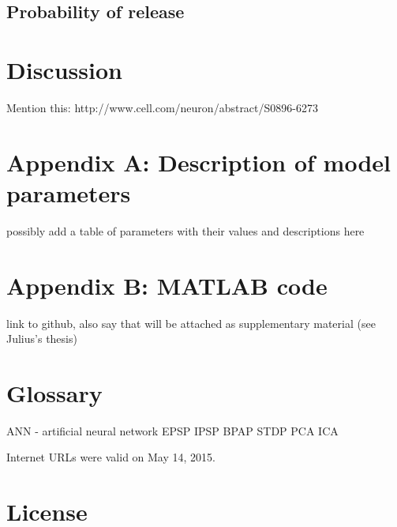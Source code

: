 \documentclass[a4paper,12pt]{report}
\theoremstyle{definition}
\begin{document}
\section{Probability of release}


\chapter{Discussion}
Mention this: http://www.cell.com/neuron/abstract/S0896-6273%


\chapter*{Appendix A: Description of model parameters}
\label{appendixparameters}

possibly add a table of parameters with their values and descriptions here

\chapter*{Appendix B: MATLAB code}

link to github, also say that will be attached as supplementary material (see Julius's thesis)


\chapter*{Glossary}
ANN - artificial neural network
EPSP
IPSP
BPAP
STDP
PCA
ICA





Internet URLs were valid on May 14, 2015.
\newpage



\chapter*{License}


%
%
\end{document}
